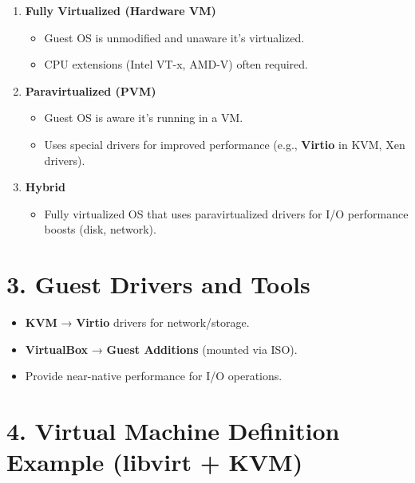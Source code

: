\documentclass[12pt,a4paper]{report}
\begin{document}
\begin{enumerate}
    \item \textbf{Fully Virtualized (Hardware VM)}
    \begin{itemize}
        \item Guest OS is unmodified and unaware it’s virtualized.
        \item CPU extensions (Intel VT-x, AMD-V) often required.
    \end{itemize}

    \item \textbf{Paravirtualized (PVM)}
    \begin{itemize}
        \item Guest OS is aware it’s running in a VM.
        \item Uses special drivers for improved performance (e.g., \textbf{Virtio} in KVM, Xen drivers).
    \end{itemize}

    \item \textbf{Hybrid}
    \begin{itemize}
        \item Fully virtualized OS that uses paravirtualized drivers for I/O performance boosts (disk, network).
    \end{itemize}
\end{enumerate}

\section*{3. Guest Drivers and Tools}

\begin{itemize}
    \item \textbf{KVM} → \textbf{Virtio} drivers for network/storage.
    \item \textbf{VirtualBox} → \textbf{Guest Additions} (mounted via ISO).
    \item Provide near-native performance for I/O operations.
\end{itemize}

\section*{4. Virtual Machine Definition Example (libvirt + KVM)}
\end{document}
